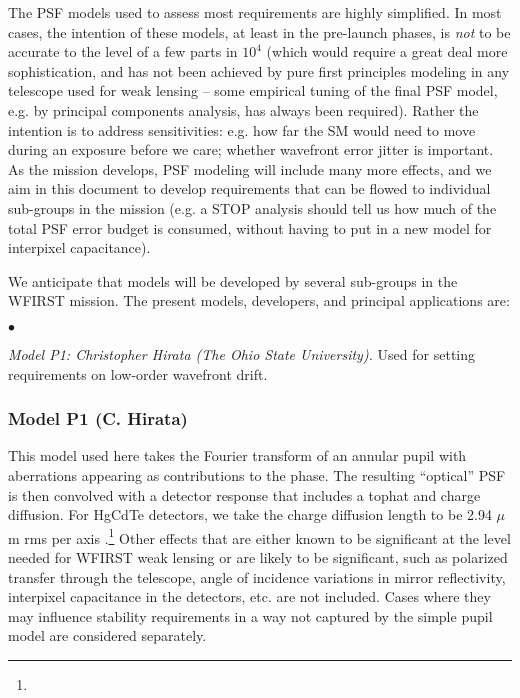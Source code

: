 The PSF models used to assess most requirements are highly simplified. In most cases, the intention of these models, at least in the pre-launch phases, is {\em not} to be accurate to the level of a few parts in $10^4$ (which would require a great deal more sophistication, and has not been achieved by pure first principles modeling in any telescope used for weak lensing -- some empirical tuning of the final PSF model, e.g. by principal components analysis, has always been required). Rather the intention is to address sensitivities: e.g. how far the SM would need to move during an exposure before we care; whether wavefront error jitter is important. As the mission develops, PSF modeling will include many more effects, and we aim in this document to develop requirements that can be flowed to individual sub-groups in the mission (e.g. a STOP analysis should tell us how much of the total PSF error budget is consumed, without having to put in a new model for interpixel capacitance).

We anticipate that models will be developed by several sub-groups in the WFIRST mission. The present models, developers, and principal applications are:
\begin{list}{$\bullet$}{}
\item {\em Model P1: Christopher Hirata (The Ohio State University).} Used for setting requirements on low-order wavefront drift.
\end{list}

\subsubsection{Model P1 (C. Hirata)}

This model used here takes the Fourier transform of an annular pupil with aberrations appearing as contributions to the phase. The resulting ``optical'' PSF is then convolved with a detector response that includes a tophat and charge diffusion. For HgCdTe detectors, we take the charge diffusion length to be 2.94 $\mu$m rms per axis \citep{2007PASP..119..466B}.\footnote{} Other effects that are either known to be significant at the level needed for WFIRST weak lensing or are likely to be significant, such as polarized transfer through the telescope, angle of incidence variations in mirror reflectivity, interpixel capacitance in the detectors, etc. are not included. Cases where they may influence stability requirements in a way not captured by the simple pupil model are considered separately.

